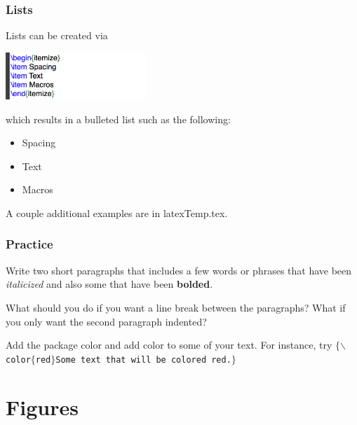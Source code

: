 \documentclass[slidestop,compress,mathserif]{beamer}
\begin{document}
\begin{frame} \frametitle{Lists}
Lists can be created via
\begin{center}
\includegraphics[height=0.7in]{basicsOfLatex/general/list}
\end{center}
which results in a bulleted list such as the following:
\begin{itemize}
\item Spacing
\item Text
\item Macros
\end{itemize}
A couple additional examples are in {\color{highlight}latexTemp.tex}.
\end{frame}

\begin{frame} \frametitle{Practice}
Write two short paragraphs that includes a few words or phrases that have been \textit{italicized} and also some that have been \textbf{bolded}.

\vspace{7mm}

What should you do if you want a line break between the paragraphs? What if you only want the second paragraph indented?

\vspace{7mm}

Add the package {\color{highlight}color} and add color to some of your text. For instance, try 
\texttt{\color{braces}$\{$\color{command}$\backslash$color\color{braces}$\{$\color{black}red\color{braces}$\}$\color{black}Some text that will be colored red.\color{braces}$\}$}
\end{frame}


\section[Figures]{Figures}
\end{document}
